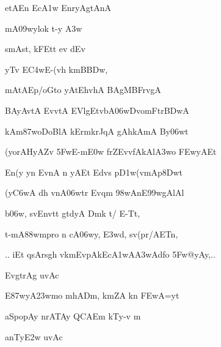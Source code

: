 \dnnemslokac 
{\dn etAEn Ec\3A1w\2 EnryAgtAnA\2}
\dontdisplaylinenum

\dnnemslokad 
{\dn mA\309wylok\? t-y \3A3w \vegdn\dontdisplaylinenum}


\dnvers

{\dn smAst, kFEt\0t ev d\?Ev{\dandabdn} \dontdisplaylinenum}

{\dn yT\4v E\3C4wE-(vh km\0B\3BDw, \vegdn\dontdisplaylinenum}

\nemsloka

\ujvers\dnnemsloka 
{\dn mAtAEp/oGto yAtEhvhA B\5AgMBFrv\?gA}
\dontdisplaylinenum

\dnnemslokab 
{\dn BAyA\0vtA\0 EvvtA\0 EVlgEtvbA\0\306wDvomF{\qvb}tr\3BDwA \dandadn\dontdisplaylinenum}

\dnnemslokac 
{\dn kAm\387woDoBlA kErmkrJqA g\5AhkAmA By\306wt\?}
\dontdisplaylinenum

\dnnemslokad 
{\dn {}(yorAHyAZ\0v\? \35FwE-m\3E0w frZEvvfAkAl\3A3wo \3FEwyAEt \vegdn\dontdisplaylinenum}


\ujvers\dnnemsloka 
{\dn En(y\2 y\?n EvnA n yAEt Edvs\2 p\3D1w(vmAp\38Dwt\?}
\dontdisplaylinenum

\dnnemslokab 
{\dn (y\3C6wA d\?h vnA\306wtr\? Evqm\? \398wAnE\399wgAlAl\? \dandadn\dontdisplaylinenum}

\dnnemslokac 
{\dn b\306w, sv\0Envt\0t\? gtdyA Dm\4{\qvb}k t/ E-Tt,}
\dontdisplaylinenum

\dnnemslokad 
{\dn t-mA\388wm\0pro n cA\306wy, \3E3wd, s\?v\?(pr/AET\0n, \vegdn\dontdisplaylinenum}


\dnvers

{\dn 
\jump
\begin{center}
{..} iEt qsArs\2g\5h\? v\0km\0EvpAkEc\3A1wA\3A3wAdfo \35Fw@yAy,{..}
\end{center}\vers}

\dnvers
\bekveg\szamveg\vfill\phpspagebreak\szam\bek{}
\thispagestyle{empty}



\jump\jump
{\dn EvgtrAg uvAc{\dandabdn}\dontdisplaylinenum }

{\dn E\387wyA\323wmo mhADm\0, km\0ZA k\?n \3FEwA=yt\?{\dandadn} \dontdisplaylinenum}

{\dn aSpopAy\2 nrATA\0y QCAEm kTy-v m\? \vegdn\dontdisplaylinenum}

{\dn anT\0y\3E2w uvAc{\dandabdn}\dontdisplaylinenum }

